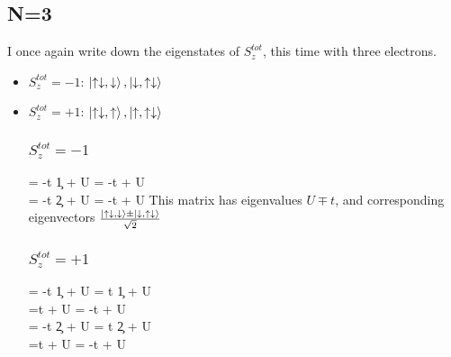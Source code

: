 \documentclass{article}
\begin{document}
\subsection{N=3}
I once again write down the eigenstates of \(S_z^{tot}\), this time with three electrons.
\begin{itemize}
\item \(S_z^{tot} = -1\): \(\ket{\uparrow\downarrow,\downarrow}, \ket{\downarrow,\uparrow\downarrow}\)
\item \(S_z^{tot} = +1\): \(\ket{\uparrow\downarrow,\uparrow}, \ket{\uparrow,\uparrow\downarrow}\)
\subsubsection{\(S_z^{tot} = -1\)}
\beq
\ham \ket{\uparrow\downarrow,\downarrow} = -t \c{1}{\uparrow}\ket{\uparrow\downarrow,\downarrow} + U\ket{\uparrow\downarrow,\downarrow} = -t\ket{\downarrow,\uparrow\downarrow} + U\ket{\uparrow\downarrow,\downarrow} \\
\ham \ket{\downarrow,\uparrow\downarrow} = -t \c{2}{\uparrow}\ket{\downarrow,\uparrow\downarrow} + U\ket{\downarrow,\uparrow\downarrow} = -t\ket{\uparrow\downarrow,\downarrow} + U\ket{\downarrow,\uparrow\downarrow}
\eeq
\beq
{}
\eeq
This matrix has eigenvalues \(U \mp t\), and corresponding eigenvectors \(\frac{\ket{\uparrow\downarrow,\downarrow} \pm \ket{\downarrow,\uparrow\downarrow}}{\sqrt{2}}\)

\subsubsection{\(S_z^{tot} = +1\)}
\beq
\ham \ket{\uparrow\downarrow,\uparrow} = -t \c{1}{\downarrow}\ket{\uparrow\downarrow,\uparrow} + U\ket{\uparrow\downarrow,\uparrow} = t \c{1}{\downarrow}\ket{\downarrow\uparrow,\uparrow} + U\ket{\uparrow\downarrow,\uparrow} \\
=t \ket{\uparrow,\downarrow\uparrow} + U\ket{\uparrow\downarrow,\uparrow} = -t \ket{\uparrow,\uparrow\downarrow} + U\ket{\uparrow\downarrow,\uparrow}\\
\ham \ket{\uparrow,\uparrow\downarrow} = -t \c{2}{\downarrow}\ket{\uparrow,\uparrow\downarrow} + U\ket{\uparrow,\uparrow\downarrow} = t \c{2}{\downarrow}\ket{\uparrow,\downarrow\uparrow} + U\ket{\uparrow,\uparrow\downarrow} \\
=t \ket{\downarrow\uparrow,\uparrow} + U\ket{\uparrow,\uparrow\downarrow} = -t \ket{\uparrow\downarrow,\uparrow} + U\ket{\uparrow,\uparrow\downarrow}\\
\eeq
\beq
{}
\eeq
\end{itemize}
\end{document}
